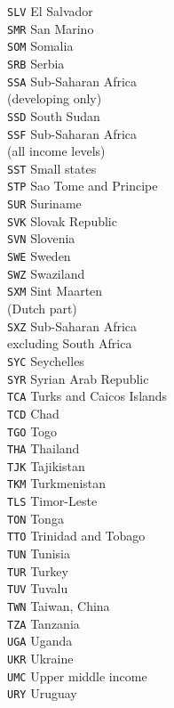 \begin{multicols}{3}
{\texttt{SLV}	El Salvador\\
\texttt{SMR}	San Marino\\
\texttt{SOM}	Somalia\\
\texttt{SRB}	Serbia\\
\texttt{SSA}	Sub-Saharan Africa\\
(developing only)\\
\texttt{SSD}	South Sudan\\
\texttt{SSF}	Sub-Saharan Africa\\
(all income levels)\\
\texttt{SST}	Small states\\
\texttt{STP}	Sao Tome and Principe\\
\texttt{SUR}	Suriname\\
\texttt{SVK}	Slovak Republic\\
\texttt{SVN}	Slovenia\\
\texttt{SWE}	Sweden\\
\texttt{SWZ}	Swaziland\\
\texttt{SXM}	Sint Maarten\\
(Dutch part)\\
\texttt{SXZ}	Sub-Saharan Africa \\
excluding South Africa\\
\texttt{SYC}	Seychelles\\
\texttt{SYR}	Syrian Arab Republic\\
\texttt{TCA}	Turks and Caicos Islands\\
\texttt{TCD}	Chad\\
\texttt{TGO}	Togo\\
\texttt{THA}	Thailand\\
\texttt{TJK}	Tajikistan\\
\texttt{TKM}	Turkmenistan\\
\texttt{TLS}	Timor-Leste\\
\texttt{TON}	Tonga\\
\texttt{TTO}	Trinidad and Tobago\\
\texttt{TUN}	Tunisia\\
\texttt{TUR}	Turkey\\
\texttt{TUV}	Tuvalu\\
\texttt{TWN}	Taiwan, China\\
\texttt{TZA}	Tanzania\\
\texttt{UGA}	Uganda\\
\texttt{UKR}	Ukraine\\
\texttt{UMC}	Upper middle income\\
\texttt{URY}	Uruguay\\
}
\end{multicols}
